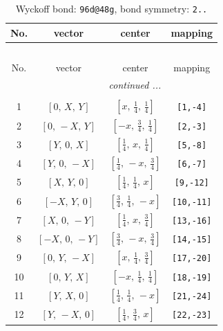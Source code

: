 \documentclass[fleqn,8pt]{jsarticle}
\begin{document}
\begin{longtable}{cccc}
\caption{Wyckoff bond: {\tt 96d@48g}, bond symmetry: {\tt 2..}}
 \\
 \hline \hline
No. & vector & center & mapping \\ \hline \endfirsthead

\multicolumn{3}{l}{\tablename\ \thetable{}} \\
 \hline \hline
No. & vector & center & mapping \\ \hline \endhead

 \hline \hline
\multicolumn{3}{r}{\footnotesize\it continued ...} \\ \endfoot

 \hline \hline
\multicolumn{3}{r}{} \\ \endlastfoot

1 & $\left[ 0,\, X,\, Y \right]$ & $\left[ x,\, \frac{1}{4},\, \frac{1}{4} \right]$ & {\tt [1,-4]} \\ \hline
2 & $\left[ 0,\, - X,\, Y \right]$ & $\left[ - x,\, \frac{3}{4},\, \frac{1}{4} \right]$ & {\tt [2,-3]} \\ \hline
3 & $\left[ Y,\, 0,\, X \right]$ & $\left[ \frac{1}{4},\, x,\, \frac{1}{4} \right]$ & {\tt [5,-8]} \\ \hline
4 & $\left[ Y,\, 0,\, - X \right]$ & $\left[ \frac{1}{4},\, - x,\, \frac{3}{4} \right]$ & {\tt [6,-7]} \\ \hline
5 & $\left[ X,\, Y,\, 0 \right]$ & $\left[ \frac{1}{4},\, \frac{1}{4},\, x \right]$ & {\tt [9,-12]} \\ \hline
6 & $\left[ - X,\, Y,\, 0 \right]$ & $\left[ \frac{3}{4},\, \frac{1}{4},\, - x \right]$ & {\tt [10,-11]} \\ \hline
7 & $\left[ X,\, 0,\, - Y \right]$ & $\left[ \frac{1}{4},\, x,\, \frac{3}{4} \right]$ & {\tt [13,-16]} \\ \hline
8 & $\left[ - X,\, 0,\, - Y \right]$ & $\left[ \frac{3}{4},\, - x,\, \frac{3}{4} \right]$ & {\tt [14,-15]} \\ \hline
9 & $\left[ 0,\, Y,\, - X \right]$ & $\left[ x,\, \frac{1}{4},\, \frac{3}{4} \right]$ & {\tt [17,-20]} \\ \hline
10 & $\left[ 0,\, Y,\, X \right]$ & $\left[ - x,\, \frac{1}{4},\, \frac{1}{4} \right]$ & {\tt [18,-19]} \\ \hline
11 & $\left[ Y,\, X,\, 0 \right]$ & $\left[ \frac{1}{4},\, \frac{1}{4},\, - x \right]$ & {\tt [21,-24]} \\ \hline
12 & $\left[ Y,\, - X,\, 0 \right]$ & $\left[ \frac{1}{4},\, \frac{3}{4},\, x \right]$ & {\tt [22,-23]} \\ \hline

\end{longtable}
\end{document}
